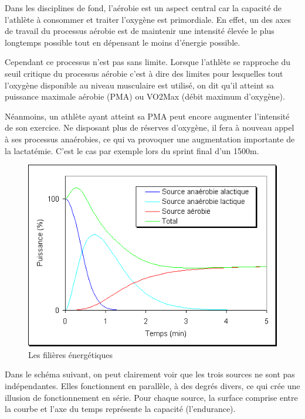         Dans les disciplines de fond, l'aérobie est un aspect central car la capacité de l'athlète à consommer et traiter l'oxygène est primordiale. En effet, un des axes de travail du processus aérobie est de maintenir une intensité élevée le plus longtemps possible tout en dépensant le moins d'énergie possible.
        
        Cependant ce processus n'est pas sans limite. 
        Lorsque l’athlète se rapproche du seuil critique du processus aérobie c'est à dire des limites pour lesquelles tout l’oxygène disponible au niveau musculaire est utilisé, on dit qu'il atteint sa puissance maximale aérobie (PMA) ou VO2Max (débit maximum d’oxygène). 
        
        Néanmoins, un athlète ayant atteint sa PMA peut encore augmenter l’intensité de son exercice. Ne disposant plus de réserves d’oxygène, il fera à nouveau appel à ses processus anaérobies, ce qui va provoquer une augmentation importante de la lactatémie. C’est le cas par exemple lors du sprint final d’un 1500m.
        
        
        \begin{figure}[H]
        \centering
        \includegraphics[scale=0.7]{images/aerobie-anaerobie-alactique2.png}
        \caption{\label{fig:filieres-energetiques}Les filières énergétiques}
         \end{figure}
         
         Dans le schéma suivant, on peut clairement voir que les trois sources ne sont pas indépendantes. Elles fonctionnent en parallèle, à des degrés divers, ce qui crée une illusion de fonctionnement en série. Pour chaque source, la surface comprise entre la courbe et l'axe du temps représente la capacité (l'endurance).\\
         
